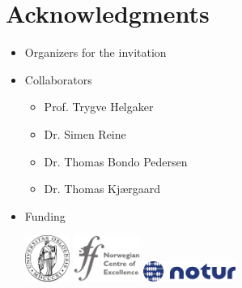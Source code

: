 \section{Acknowledgments}
\begin{frame}
   \begin{itemize}
        \item Organizers for the invitation
        \item Collaborators
          \begin{itemize}
          \item Prof. Trygve Helgaker
          \item Dr. Simen Reine
          \item Dr. Thomas Bondo Pedersen
          \item Dr. Thomas Kj{\ae}rgaard
          \end{itemize}
          
        \item Funding
          \begin{center}
            \includegraphics[height=1.5cm]{uio.pdf}\hspace{1cm}
            \includegraphics[height=1.5cm]{sff.pdf}\hspace{1cm}
            \includegraphics[width=3cm]{notur_large.png}\hspace{1cm}
          \end{center}
   \end{itemize}
\end{frame}


